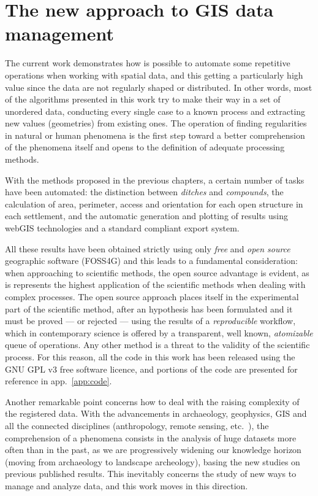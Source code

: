     \section{The new approach to GIS data management}
        The current work demonstrates how is possible to automate some repetitive operations when working with spatial data, and this getting a particularly high value since the data are not regularly shaped or distributed. In other words, most of the algorithms presented in this work try to make their way in a set of unordered data, conducting every single case to a known process and extracting new values (geometries) from existing ones. The operation of finding regularities in natural or human phenomena is the first step toward a better comprehension of the phenomena itself and opens to the definition of adequate processing methods.

        With the methods proposed in the previous chapters, a certain number of tasks have been automated: the distinction between \emph{ditches} and \emph{compounds}, the calculation of area, perimeter, access and orientation for each open structure in each settlement, and the automatic generation and plotting of results using webGIS technologies and a standard compliant export system.

        All these results have been obtained strictly using only \emph{free} and \emph{open source} geographic software (FOSS4G) and this leads to a fundamental consideration: when approaching to scientific methods, the open source advantage is evident, as is represents the highest application of the scientific methods when dealing with complex processes. The open source approach places itself in the experimental part of the scientific method, after an hypothesis has been formulated and it must be proved --- or rejected --- using the results of a \emph{reproducible} workflow, which in contemporary science is offered by a transparent, well known, \emph{atomizable} queue of operations. Any other method is a threat to the validity of the scientific process. For this reason, all the code in this work has been released using the GNU GPL v3 free software licence, and portions of the code are presented for reference in app.~\ref{app:code}.

        Another remarkable point concerns how to deal with the raising complexity of the registered data. With the advancements in archaeology, geophysics, GIS and all the connected disciplines (anthropology, remote sensing, etc.\ ), the comprehension of a phenomena consists in the analysis of huge datasets more often than in the past, as we are progressively widening our knowledge horizon (moving from archaeology to landscape archeology), basing the new studies on previous published results. This inevitably concerns the study of new ways to manage and analyze data, and this work moves in this direction.
        
